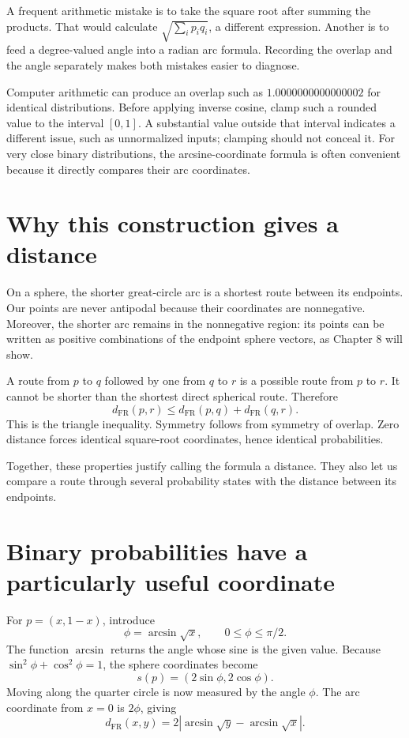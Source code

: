 \documentclass[11pt,oneside,openany]{book}
\theoremstyle{definition}
\theoremstyle{remark}
\numberwithin{equation}{chapter}
\begin{document}
A frequent arithmetic mistake is to take the square root after summing the products. That would calculate \(\sqrt{\sum_i p_iq_i}\), a different expression. Another is to feed a degree-valued angle into a radian arc formula. Recording the overlap and the angle separately makes both mistakes easier to diagnose.

Computer arithmetic can produce an overlap such as \(1.0000000000000002\) for identical distributions. Before applying inverse cosine, clamp such a rounded value to the interval \([0,1]\). A substantial value outside that interval indicates a different issue, such as unnormalized inputs; clamping should not conceal it. For very close binary distributions, the arcsine-coordinate formula is often convenient because it directly compares their arc coordinates.

\section{Why this construction gives a distance}\label{ch07-why-this-construction-gives-a-distance}

On a sphere, the shorter great-circle arc is a shortest route between its endpoints. Our points are never antipodal because their coordinates are nonnegative. Moreover, the shorter arc remains in the nonnegative region: its points can be written as positive combinations of the endpoint sphere vectors, as Chapter 8 will show.

A route from \(p\) to \(q\) followed by one from \(q\) to \(r\) is a possible route from \(p\) to \(r\). It cannot be shorter than the shortest direct spherical route. Therefore \[d_{\mathrm{FR}}(p,r)\leq d_{\mathrm{FR}}(p,q)+d_{\mathrm{FR}}(q,r).\] This is the triangle inequality. Symmetry follows from symmetry of overlap. Zero distance forces identical square-root coordinates, hence identical probabilities.

Together, these properties justify calling the formula a distance. They also let us compare a route through several probability states with the distance between its endpoints.

\section{Binary probabilities have a particularly useful coordinate}\label{ch07-binary-probabilities-have-a-particularly-useful-coordinate}

For \(p=(x,1-x)\), introduce \[\phi=\arcsin\sqrt{x},\qquad 0\leq\phi\leq\pi/2.\] The function \(\arcsin\) returns the angle whose sine is the given value. Because \(\sin^2\phi+\cos^2\phi=1\), the sphere coordinates become \[s(p)=(2\sin\phi,2\cos\phi).\] Moving along the quarter circle is now measured by the angle \(\phi\). The arc coordinate from \(x=0\) is \(2\phi\), giving \[\boxed{d_{\mathrm{FR}}(x,y)
=2|\arcsin\sqrt y-\arcsin\sqrt x|.}\]
\end{document}
